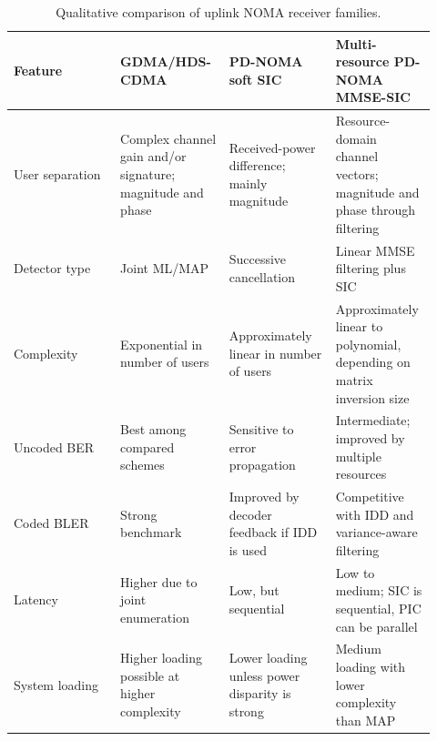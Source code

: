 \begin{table}[t]
\centering
\caption{Qualitative comparison of uplink NOMA receiver families.}
\label{tab:receiver-tradeoff}
\begin{tabular}{p{0.24\linewidth}p{0.24\linewidth}p{0.24\linewidth}p{0.20\linewidth}}
\toprule
Feature & GDMA/HDS-CDMA & PD-NOMA soft SIC & Multi-resource PD-NOMA MMSE-SIC \\
\midrule
User separation & Complex channel gain and/or signature; magnitude and phase & Received-power difference; mainly magnitude & Resource-domain channel vectors; magnitude and phase through filtering \\
Detector type & Joint ML/MAP & Successive cancellation & Linear MMSE filtering plus SIC \\
Complexity & Exponential in number of users & Approximately linear in number of users & Approximately linear to polynomial, depending on matrix inversion size \\
Uncoded BER & Best among compared schemes & Sensitive to error propagation & Intermediate; improved by multiple resources \\
Coded BLER & Strong benchmark & Improved by decoder feedback if IDD is used & Competitive with IDD and variance-aware filtering \\
Latency & Higher due to joint enumeration & Low, but sequential & Low to medium; SIC is sequential, PIC can be parallel \\
System loading & Higher loading possible at higher complexity & Lower loading unless power disparity is strong & Medium loading with lower complexity than MAP \\
\bottomrule
\end{tabular}
\end{table}
